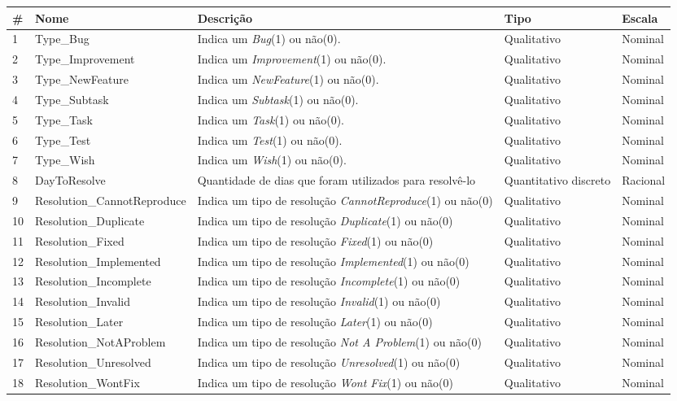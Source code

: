 \documentclass[11pt,twoside]{article}
\begin{document}
\begin{table}[ht]\centering
  \tiny
  \renewcommand{\arraystretch}{1.2}
  \begin{tabular}{@{}llp{9cm}p{2cm}l@{}}\toprule
    \#  &  Nome  &  Descrição  &  Tipo  &  Escala \\
    \midrule 
    1  &  Type\_Bug  &  Indica um \textit{Bug}(1) ou não(0). &  Qualitativo  &  Nominal \\
    2  &  Type\_Improvement  &  Indica um \textit{Improvement}(1) ou não(0). &  Qualitativo  &  Nominal \\
    3  &  Type\_NewFeature  &  Indica um \textit{NewFeature}(1) ou não(0). &  Qualitativo  &  Nominal \\
    4  &  Type\_Subtask  &  Indica um \textit{Subtask}(1) ou não(0). &  Qualitativo  &  Nominal \\
    5  &  Type\_Task  &  Indica um \textit{Task}(1) ou não(0). &  Qualitativo  &  Nominal \\
    6  &  Type\_Test  &  Indica um \textit{Test}(1) ou não(0). &  Qualitativo  &  Nominal \\
	7  &  Type\_Wish  &  Indica um \textit{Wish}(1) ou não(0). &  Qualitativo  &  Nominal \\
    8  &  DayToResolve  &  Quantidade de dias que foram utilizados para resolvê-lo  &  Quantitativo discreto  &  Racional \\
    9  &  Resolution\_CannotReproduce  &  Indica um tipo de resolução \textit{CannotReproduce}(1) ou não(0)  &  Qualitativo  &  Nominal\\
    10  &  Resolution\_Duplicate  &  Indica um tipo de resolução \textit{Duplicate}(1) ou não(0)  &  Qualitativo  &  Nominal\\
    11  &  Resolution\_Fixed  &  Indica um tipo de resolução \textit{Fixed}(1) ou não(0)  &  Qualitativo  &  Nominal\\
    12  &  Resolution\_Implemented  &  Indica um tipo de resolução \textit{Implemented}(1) ou não(0)  &  Qualitativo  &  Nominal\\
    13  &  Resolution\_Incomplete  &  Indica um tipo de resolução \textit{Incomplete}(1) ou não(0)  &  Qualitativo  &  Nominal\\
    14  &  Resolution\_Invalid  &  Indica um tipo de resolução \textit{Invalid}(1) ou não(0)  &  Qualitativo  &  Nominal\\
 	15  &  Resolution\_Later  &  Indica um tipo de resolução \textit{Later}(1) ou não(0)  &  Qualitativo  &  Nominal\\
    16  &  Resolution\_NotAProblem  &  Indica um tipo de resolução \textit{Not A Problem}(1) ou não(0)  &  Qualitativo  &  Nominal\\
    17  &  Resolution\_Unresolved  &  Indica um tipo de resolução \textit{Unresolved}(1) ou não(0)  &  Qualitativo  &  Nominal\\
    18  &  Resolution\_WontFix  &  Indica um tipo de resolução \textit{Wont Fix}(1) ou não(0)  &  Qualitativo  &  Nominal\\
    

\end{tabular}
\end{table}
\end{document}

